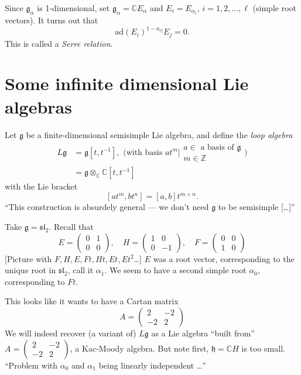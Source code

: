 \begin{remark}
\label{remark-}
Since $\mathfrak{g}_\alpha$ is 1-dimensional, set
$\mathfrak{g}_\alpha=\mathbb{C}E_\alpha$ and 
$E_i=E_{\alpha_i}$, $i=1,2,\ldots,\ell$ (simple root vectors). 
It turns out that 
$$
\text{ad}(E_i)^{1-a_{ij}}E_j=0.
$$
This is called a {\it Serre relation}.
\end{remark}

\section{Some infinite dimensional Lie algebras}
\label{section-some-infinite-dimensional-Lie-algebras}
Let $\mathfrak{g}$ be a finite-dimensional semisimple Lie algebra, and define
the {\it loop algebra} 
\begin{align*}
L\mathfrak{g}&=\mathfrak{g}[t,t^{-1}],\text{ (with basis 
$at^m|\substack{\text{$a \in $ a basis of $\mathfrak{g}$} \\ m \in \mathbb{Z}}$
)}\\
&=\mathfrak{g} \otimes _{\mathbb{C}}\mathbb{C}[t,t^{-1}]
\end{align*}
with the Lie bracket
$$
[at^m,bt^n]=[a,b]t^{m+n}.
$$
``This construction is absurdely general --- we don't need $\mathfrak{g}$ to be
semisimple […]''

\medskip\noindent
Take $\mathfrak{g}=\mathfrak{sl}_2$. Recall that
$$
E=\begin{pmatrix}
0&1\\ 
0&0
\end{pmatrix},\quad 
H=\begin{pmatrix}
1&0\\ 
0&-1
\end{pmatrix},\quad 
F=\begin{pmatrix}
0&0\\ 
1&0
\end{pmatrix}
$$
[Picture with $F,H,E,Ft,Ht,Et,Et^2$…]
$E$ was a root vector, corresponding to the unique root in $\mathfrak{sl}_2$,
call it $\alpha_1$. We seem to have a second simple root $\alpha_0$,
 corresponding to $Ft$.

This looks like it wants to have a Cartan matrix
 $$
A=\begin{pmatrix}
2&-2\\ 
-2&2
\end{pmatrix}
$$
We will indeed recover (a variant of) $L\mathfrak{g}$ as a Lie algebra 
``built from'' $A=\begin{pmatrix}
2&-2\\ 
-2&2
\end{pmatrix}$,
 a Kac-Moody algebra. 
But note first, $\mathfrak{h}=\mathbb{C}H$ is too small.
``Problem with $\alpha_0$ and $\alpha_1$ being linearly independent  …''

